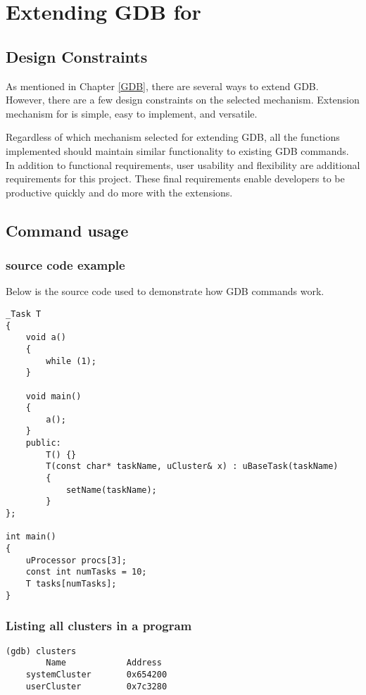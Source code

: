 \chapter{Extending GDB for \uCPP}
\section{Design Constraints}
As mentioned in Chapter \ref{GDB}, there are several ways to extend GDB. However,
there are a few design constraints on the selected mechanism. Extension
mechanism for \uCPPS is simple, easy to implement, and versatile.

Regardless of which mechanism selected for extending GDB, all the functions
implemented should maintain similar functionality to existing GDB commands. In addition to functional
requirements, user usability and flexibility are additional requirements for this
project. These final requirements enable developers to be productive quickly
and do more with the extensions.

\section{Command usage}
\subsection{\uCPPS source code example}
Below is the \uCPPS source code used to demonstrate how GDB commands work.
\begin{lstlisting}[caption={\uCPPS source code for GDB examples},
label={uC++-src-code}]
_Task T
{
    void a()
    {
        while (1);
    }

    void main()
    {
        a();
    }
    public:
        T() {}
        T(const char* taskName, uCluster& x) : uBaseTask(taskName)
        {
            setName(taskName);
        }
};

int main()
{
    uProcessor procs[3];
    const int numTasks = 10;
    T tasks[numTasks];
}
\end{lstlisting}
\subsection{Listing all clusters in a \uCPPS program}

\begin{lstlisting}[caption={clusters command}]
(gdb) clusters
        Name            Address
    systemCluster       0x654200
    userCluster         0x7c3280
\end{lstlisting}

